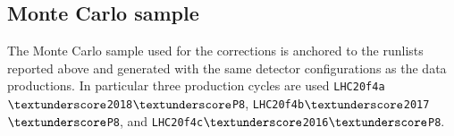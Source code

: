 \begin{itemize}


\end{itemize}

\subsection{Monte Carlo sample}
\label{sec:mc_sample}
The Monte Carlo sample used for the corrections is anchored to the runlists reported above and generated with the same detector configurations as the data productions. In particular three production cycles are used  \texttt{LHC20f4a$\textunderscore$2018$\textunderscore$P8}, \texttt{LHC20f4b$\textunderscore$2017$\textunderscore$P8}, and \texttt{LHC20f4c$\textunderscore$2016$\textunderscore$P8}.%



